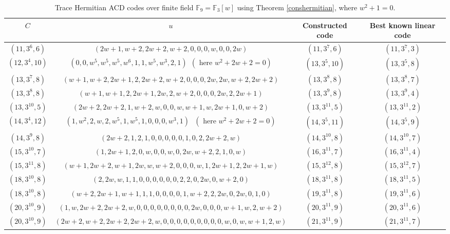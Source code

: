 \documentclass[sn-mathphys-num]{sn-jnl}%
\theoremstyle{thmstyleone}%
\theoremstyle{thmstyletwo}%
\theoremstyle{thmstylethree}%
\begin{document}
\begin{table}[h!]
	\begin{center}
		\begin{adjustbox}{width=\textwidth}
			\begin{tabular}{|c|c|c|c|}
				\hline
				$C$&$u$&Constructed code& Best known linear code\\
				\hline
				$(11,3^6,6)$&$(2w+1,w+2,2w+2,w+2,0,0,0,w,0,0,2w)$&$(11,3^7,6)$& $(11,3^7,3)$\\
				\hline
				$(12,3^{4},10)$&$( 0,0, w^5, w^5, w^5, w^6, 1, 1, w^5,w^3, 2, 1) \ \ (\text{ here } w^2+2w+2=0)$&$(13,3^{5},10)$& $(13,3^5,8)$\\
				\hline
				$(13,3^{7},8)$&$(w+1,w+2,2w+1,2,2w+2,w+2,0,0,0,2w,2w,w+2,2w+2)$&$(13,3^{8},8)$& $(13,3^8,7)$\\
				\hline
				
				$(13,3^{8},8)$&$(w + 1, w + 1, 2, 2w + 1, 2w, 2, w + 2, 0, 0, 0, 2w, 2, 2w + 1)$&$(13,3^{9},8)$& $(13,3^9,4)$\\
				\hline
				$(13,3^{10},5)$&$(2w+2,2w+2,1,w+2,w,0,0,w,w+1,w,2w+1,0,w+2)$&$(13,3^{11},5)$& $(13,3^{11},2)$\\
				\hline
				$(14,3^{4},12)$&$(1, w^2,   2,   w,   2, w^5,   1, w^5,   1,   0,   0,   0, w^3,   1)\ \ \ (\text{ here } w^2+2w+2=0)$&$(14,3^{5},11)$& $(14,3^5,9)$\\
				\hline
				$(14,3^{9},8)$&$(2w + 2, 1, 2, 1, 0,0, 0, 0, 0, 1, 0, 2, 2w + 2, w)$&$(14,3^{10},8)$& $(14,3^{10},7)$\\
				\hline
				$(15,3^{10},7)$&$(1,2w+1,2,0,w,0,0,w,0,2w,w+2,2,1,0,w)$&$(16,3^{11},7)$& $(16,3^{11},4)$\\
				\hline
				$(15,3^{11},8)$&$(w+1,2w +2, w+1, 2w, w, w +2, 0, 0, 0, w, 1, 2w+1, 2, 2w +1, w)$&$(15,3^{12},8)$& $(15,3^{12},7)$\\
				\hline
				$(18,3^{10},8)$&$(2,2w,w,1,1,0,0,0,0,0,0,2,2,0,2w,0,w+2,0)$&$(18,3^{11},8)$& $(18,3^{11},5)$\\
				
				\hline
				$(18,3^{10},8)$&$(w+2,2w+1,w+1,1,1,0,0,0,0,1,w+2,2,2w,0,2w,0,1,0)$&$(19,3^{11},8)$& $(19,3^{11},6)$\\
				\hline
				$(20,3^{10},9)$&$(1,w,2w+2,2w+2,w,0,0,0,0,0,0,0,0,2w,0,0,0,w+1,w,2,w+2)$&$(20,3^{11},9)$& $(20,3^{11},6)$\\
				\hline
				$(20,3^{10},9)$&$(2w+2,w+2,2w+2,2w+2,w,0,0,0,0,0,0,0,0,0,w,0,w,w+1,2,w)$&$(21,3^{11},9)$& $(21,3^{11},7)$\\
				\hline
			\end{tabular}
		\end{adjustbox}
	\end{center}
	\caption{ Trace Hermitian ACD codes over finite field $\mathbb{F}_9=\mathbb{F}_3[w]$ using Theorem \ref{conshermitian}, where $w^2+1=0$. \label{Thermitian}}
\end{table}
\end{document}
